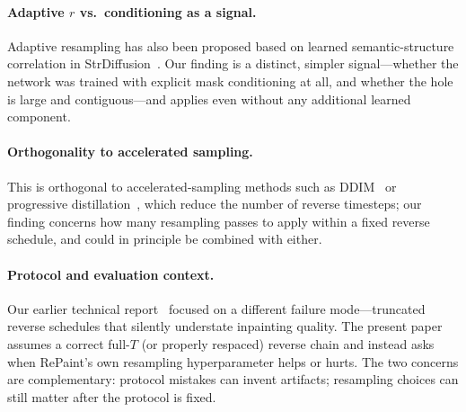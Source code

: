 \paragraph{Adaptive $r$ vs.\ conditioning as a signal.}
Adaptive resampling has also been proposed based on learned semantic-structure correlation in StrDiffusion~\citep{liu2024strdiffusion}.
Our finding is a distinct, simpler signal---whether the network was trained with explicit mask conditioning at all, and whether the hole is large and contiguous---and applies even without any additional learned component.

\paragraph{Orthogonality to accelerated sampling.}
This is orthogonal to accelerated-sampling methods such as DDIM~\citep{song2021ddim} or progressive distillation~\citep{salimans2022distill}, which reduce the number of reverse timesteps; our finding concerns how many resampling passes to apply within a fixed reverse schedule, and could in principle be combined with either.

\paragraph{Protocol and evaluation context.}
Our earlier technical report~\citep{hamouda2026protocol} focused on a different failure mode---truncated reverse schedules that silently understate inpainting quality.
The present paper assumes a correct full-$T$ (or properly respaced) reverse chain and instead asks when RePaint's own resampling hyperparameter helps or hurts.
The two concerns are complementary: protocol mistakes can invent artifacts; resampling choices can still matter after the protocol is fixed.
